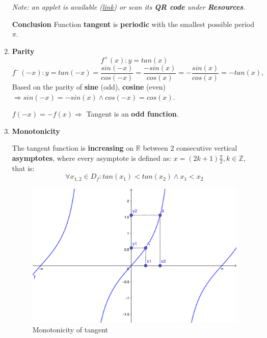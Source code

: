 \documentclass{article}
\begin{document}
\begin{enumerate}
    \textit{Note: an applet is available (\href{https://www.geogebra.org/m/qr7hjqs6}{link}) or scan its \textbf{QR code} under \textbf{Resources}}.
    
    \textbf{Conclusion}
    Function \textbf{tangent} is \textbf{periodic} with the smallest possible
    period $\pi$.
    
    \item \textbf{Parity}
    \[
    f^+(x):y=tan(x)
    \]
    \[
    f^-(-x):y=tan(-x) = \frac{sin(-x)}{cos(-x)} = \frac{-sin(x)}{cos(x)} = -\frac{sin(x)}{cos(x)} = -tan(x),
    \]
    Based on the parity of \textbf{sine} (odd), \textbf{cosine} (even) $\Rightarrow sin(-x)=-sin(x) \land cos(-x) = cos(x)$.
    
    $f(-x) = -f(x) \Rightarrow$ Tangent is an \textbf{odd function}.
    
    \item \textbf{Monotonicity}
    
    The tangent function is \textbf{increasing} on $\mathbb{R}$ between 2 consecutive vertical \textbf{asymptotes}, where every asymptote is defined as: $x=(2k + 1)\frac{\pi}{2}, k \in\mathbb{Z}$,\\that is:
    \[
    \forall x_{1,2}\in D_f:tan(x_1)<tan(x_2) \land x_1<x_2 
    \]
    
    \begin{figure}[ht!]
        \centering
        \vspace{-10pt}
        \centering\includegraphics[scale=0.92]{monotony.png}
        \vspace{-10pt}
        \caption{Monotonicity of tangent}
        \vspace{-10pt}
    \end{figure}
    

\end{enumerate}
\end{document}
